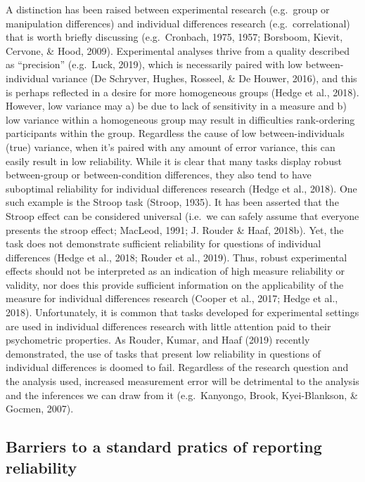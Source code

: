 \documentclass[english,,man,floatsintext]{apa6}
\begin{document}
A distinction has been raised between experimental research (e.g.~group or manipulation differences) and individual differences research (e.g.~correlational) that is worth briefly discussing (e.g.~Cronbach, 1975, 1957; Borsboom, Kievit, Cervone, \& Hood, 2009). Experimental analyses thrive from a quality described as \enquote{precision} (e.g.~Luck, 2019), which is necessarily paired with low between-individual variance (De Schryver, Hughes, Rosseel, \& De Houwer, 2016), and this is perhaps reflected in a desire for more homogeneous groups (Hedge et al., 2018). However, low variance may a) be due to lack of sensitivity in a measure and b) low variance within a homogeneous group may result in difficulties rank-ordering participants within the group. Regardless the cause of low between-individuals (true) variance, when it's paired with any amount of error variance, this can easily result in low reliability. While it is clear that many tasks display robust between-group or between-condition differences, they also tend to have suboptimal reliability for individual differences research (Hedge et al., 2018). One such example is the Stroop task (Stroop, 1935). It has been asserted that the Stroop effect can be considered universal (i.e.~we can safely assume that everyone presents the stroop effect; MacLeod, 1991; J. Rouder \& Haaf, 2018b). Yet, the task does not demonstrate sufficient reliability for questions of individual differences (Hedge et al., 2018; Rouder et al., 2019). Thus, robust experimental effects should not be interpreted as an indication of high measure reliability or validity, nor does this provide sufficient information on the applicability of the measure for individual differences research (Cooper et al., 2017; Hedge et al., 2018). Unfortunately, it is common that tasks developed for experimental settings are used in individual differences research with little attention paid to their psychometric properties. As Rouder, Kumar, and Haaf (2019) recently demonstrated, the use of tasks that present low reliability in questions of individual differences is doomed to fail. Regardless of the research question and the analysis used, increased measurement error will be detrimental to the analysis and the inferences we can draw from it (e.g.~Kanyongo, Brook, Kyei-Blankson, \& Gocmen, 2007).

\hypertarget{barriers-to-a-standard-pratics-of-reporting-reliability}{%
\subsection{Barriers to a standard pratics of reporting reliability}\label{barriers-to-a-standard-pratics-of-reporting-reliability}}
\end{document}
